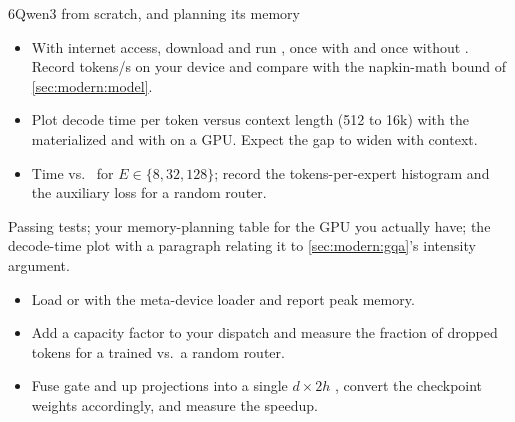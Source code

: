 \begin{labbox}{6}{Qwen3 from scratch, and planning its memory}
\begin{itemize}
\item With internet access, download  and run
  , once with and once without .
  Record tokens/s on your device and compare with the napkin-math bound of \cref{sec:modern:model}.
\item Plot decode time per token versus context length (512 to 16k) with the materialized
   and with  on a
  GPU. Expect the gap to widen with context.
\item Time  vs.\  for $E\in\{8,32,128\}$; record the
  tokens-per-expert histogram and the auxiliary loss for a random router.
\end{itemize}

Passing tests; your memory-planning table for the GPU you actually have; the decode-time plot with a
paragraph relating it to \cref{sec:modern:gqa}'s intensity argument.

\begin{itemize}
\item Load  or  with the meta-device loader and report peak memory.
\item Add a capacity factor to your dispatch and measure the fraction of dropped tokens for a trained vs.\
  a random router.
\item Fuse gate and up projections into a single $d\times2h$ , convert the checkpoint
  weights accordingly, and measure the speedup.
\end{itemize}
\end{labbox}
